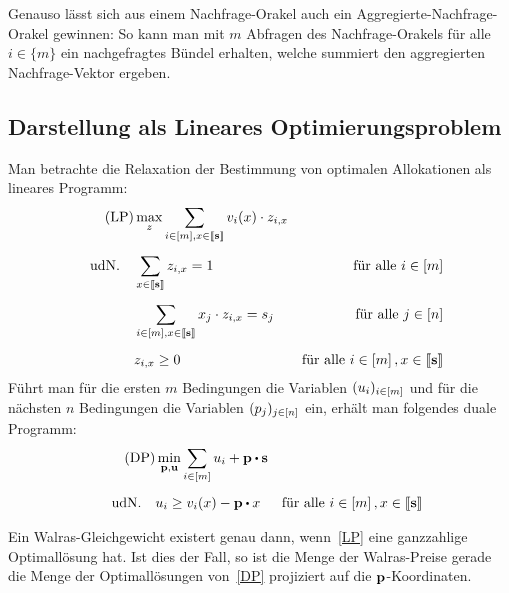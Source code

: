 Genauso lässt sich aus einem Nachfrage-Orakel auch ein Aggregierte-Nachfrage-Orakel gewinnen: So kann man mit $m$ Abfragen des Nachfrage-Orakels für alle $i\in\{m\}$ ein nachgefragtes Bündel erhalten, welche summiert den aggregierten Nachfrage-Vektor ergeben.


\subsection{Darstellung als Lineares Optimierungsproblem}

Man betrachte die Relaxation der Bestimmung von optimalen Allokationen als lineares Programm:
\begin{align*}
	\tag{LP}\label{LP}
	&\max_{z} \sum_{i\in\left[ m \right], x\in\left\llbracket \mathbf{s} \right\rrbracket} v_i(x) \cdot z_{i, x} \\[5pt]
	\text{udN.} \quad & \sum_{x\in\left\llbracket \mathbf{s} \right\rrbracket} z_{i, x} = 1 & \text{für alle $i\in\left[ m \right]$}\\[5pt]
	& \sum_{i\in\left[ m \right], x\in\left\llbracket \mathbf{s} \right\rrbracket} x_j \cdot z_{i,x} = s_j & \text{für alle $j\in\left[ n \right]$} \\[5pt]
	& z_{i, x} \geq 0 &\text{für alle $i\in\left[ m \right], x\in\left\llbracket \mathbf{s} \right\rrbracket$}
\end{align*}
Führt man für die ersten $m$ Bedingungen die Variablen $(u_i)_{i\in\left[ m \right]}$ und für die nächsten $n$ Bedingungen die Variablen $(p_j)_{j\in\left[ n \right]}$ ein, erhält man folgendes duale Programm:
\begin{align*}
\tag{DP}\label{DP}
&\min_{\fp,\fu} \sum_{i\in\first{m}} u_i + \fp \bcdot \fs \\[5pt]
\text{udN.} \quad &  u_i \geq v_i(x) - \fp \bcdot x & \text{für alle $i\in\first{m}, x\in\ffirst{\fs}$}
\end{align*}
\begin{lemma}
	Ein Walras-Gleichgewicht existert genau dann, wenn~\eqref{LP} eine ganzzahlige Optimallösung hat.
	Ist dies der Fall, so ist die Menge der Walras-Preise gerade die Menge der Optimallösungen von~\eqref{DP} projiziert auf die $\mathbf{p}$-Koordinaten.
\end{lemma}
